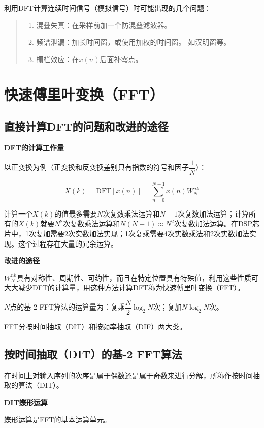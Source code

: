 \documentclass[cn, hazy, blue, normal, 14pt]{elegantnote}
\begin{document}
利用DFT计算连续时间信号（模拟信号）时可能出现的几个问题：

\begin{quote}
\begin{enumerate}
    \item 混叠失真：在采样前加一个防混叠滤波器。
    \item 频谱泄漏：加长时间窗，或使用加权的时间窗。
    如汉明窗等。
    \item 栅栏效应：在$x(n)$后面补零点。
\end{enumerate}
\end{quote}

\section{快速傅里叶变换（FFT）}

\subsection{直接计算DFT的问题和改进的途径}

\textbf{DFT的计算工作量}

以正变换为例（正变换和反变换差别只有指数的符号和因子$\dfrac{1}{N}$）：

$$X(k)=\text{DFT}[{x}(n)]=\sum_{n=0}^{N-1}{{x}(n)W_{N}^{nk}}$$

计算一个$X(k)$的值最多需要$N$次复数乘法运算和$N-1$次复数加法运算；计算所有的$X(k)$就要$N^2$次复数乘法运算和$N(N-1)\approx N^2$次复数加法运算。在DSP芯片中，1次复加需要2次实数加法实现；1次复乘需要4次实数乘法和2次实数加法实现。这个过程存在大量的冗余运算。

\textbf{改进的途径}

$W_N^{nk}$具有对称性、周期性、可约性，而且在特定位置具有特殊值，利用这些性质可大大减少DFT的计算量，用这种方法计算DFT称为快速傅里叶变换（FFT）。

$N$点的基-2 FFT算法的运算量为：复乘$\dfrac{N}{2}\log_2 N$次；复加$N\log_2 N$次。

FFT分按时间抽取（DIT）和按频率抽取（DIF）两大类。


\subsection{按时间抽取（DIT）的基-2 FFT算法}

在时间上对输入序列的次序是属于偶数还是属于奇数来进行分解，所称作按时间抽取的算法（DIT）。

\textbf{DIT蝶形运算}

蝶形运算是FFT的基本运算单元。
\end{document}
